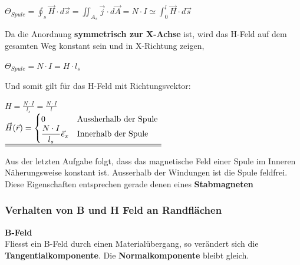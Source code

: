 \begin{center}

	$\displaystyle \Theta_{Spule} = \oint_{s} \vec{H} \cdot d\vec{s} = \iint_{A_s} \vec{j} \cdot d\vec{A} = N \cdot I \simeq \int_0^l \vec{H} \cdot d\vec{s}$
	\end{center}

	Da die Anordnung \textbf{symmetrisch zur X-Achse} ist, wird das H-Feld auf dem gesamten Weg konstant sein und in X-Richtung zeigen,
	\begin{center}

	$ \displaystyle \Theta_{Spule} = N \cdot I = H \cdot l_{s}$

	\end{center}
	Und somit gilt für das H-Feld mit Richtungsvektor:
	\begin{center}

	$\displaystyle H = \frac{N\cdot I}{l_{s}}  = \frac{N\cdot I}{l}$ \\ \fspace
 	$\displaystyle
		\underline{\underline{   \vec{H}(\vec{r}) =
		\begin{cases}
0 & $Aussherhalb der Spule $\\
\displaystyle \frac{N\cdot I}{l_{s}} \vec{e}_x & $Innerhalb der Spule $\\
\end{cases}}}$

	\end{center}
	\iend


	Aus der letzten Aufgabe folgt, dass das magnetische Feld einer Spule im Inneren Näherungsweise konstant ist. Ausserhalb der Windungen ist die Spule feldfrei. \\
	Diese Eigenschaften entsprechen gerade denen eines \textbf{Stabmagneten}


\subsubsection{Verhalten von B und H Feld an Randflächen}
\fix \fix
\textbf{B-Feld} \\
Fliesst ein B-Feld durch einen Materialübergang, so verändert sich die \textbf{Tangentialkomponente}. Die \textbf{Normalkomponente} bleibt gleich.
\begin{center}
\end{center}

